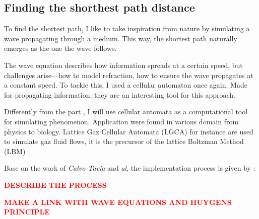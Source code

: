 \documentclass[../main.tex]{subfiles}
\begin{document}
\subsection{Finding the shorthest path distance}
To find the shortest path, I like to take inspiration from nature by simulating a wave propagating through a medium. This way, the shortest path naturally emerges as the one the wave follows.  

The wave equation describes how information spreads at a certain speed, but challenges arise—how to model refraction, how to ensure the wave propagates at a constant speed. To tackle this, I used a cellular automaton once again. Made for propagating information, they are an interesting tool for this approach.\cite{tapia_2016}

Differently from the part \figtonum, I will use cellular automata as a computational tool for simulating phenomenon. Application were found in various domain from physics to biology. Lattice Gaz Cellular Automata (LGCA) for instance are used to simulate gaz fluid flows, it is the precursor of the lattice Boltzman Method (LBM)\cite{chen_1998}

Base on the work of \textit{Calvo Tavia} and \textit{al}, the implementation process is given by :

\textcolor{red}{\textbf{DESCRIBE THE PROCESS}}


\textcolor{red}{\textbf{MAKE A LINK WITH WAVE EQUATIONS AND HUYGENS PRINCIPLE}}
\end{document}
